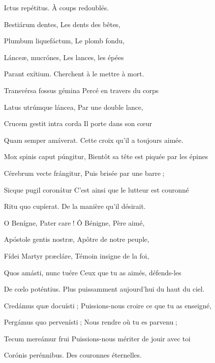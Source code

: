 \begin{paracol}{2}
Ictus repétitus.
\switchcolumn
À coups redoublés.
\switchcolumn*

Bestiárum dentes,
\switchcolumn
Les dents des bêtes,
\switchcolumn*

Plumbum liquefáctum,
\switchcolumn
Le plomb fondu,
\switchcolumn*

Lánceæ, mucrónes,
\switchcolumn
Les lances, les épées
\switchcolumn*

Parant exítium.
\switchcolumn
Cherchent à le mettre à mort.
\switchcolumn*

Transvérsa fossus gémina
\switchcolumn
Percé en travers du corps
\switchcolumn*

Latus utrúmque láncea,
\switchcolumn
Par une double lance,
\switchcolumn*

Crucem gestit intra corda
\switchcolumn
Il porte dans son cœur
\switchcolumn*

Quam semper amáverat.
\switchcolumn
Cette croix qu’il a toujours aimée.
\switchcolumn*

Mox spinis caput púngitur,
\switchcolumn
Bientôt sa tête est piquée par les épines
\switchcolumn*

Cérebrum vecte frángitur,
\switchcolumn
Puis brisée par une barre ;
\switchcolumn*

Sicque pugil coronátur
\switchcolumn
C’est ainsi que le lutteur est couronné
\switchcolumn*

Ritu quo cupíerat.
\switchcolumn
De la manière qu’il désirait.
\switchcolumn*

O Benígne, Pater care !
\switchcolumn
Ô Bénigne, Père aimé,
\switchcolumn*

Apóstole gentis nostræ,
\switchcolumn
Apôtre de notre peuple,
\switchcolumn*

Fídei Martyr præcláre,
\switchcolumn
Témoin insigne de la foi,
\switchcolumn*

Quos amásti, nunc tuére
\switchcolumn
Ceux que tu as aimés, défends-les
\switchcolumn*

De cœlo poténtius.
\switchcolumn
Plus puissamment aujourd’hui du haut du ciel.
\switchcolumn*

Credámus quæ docuísti ;
\switchcolumn
Puissions-nous croire ce que tu as enseigné,
\switchcolumn*

Pergámus quo pervenísti ;
\switchcolumn
Nous rendre où tu es parvenu ;
\switchcolumn*

Tecum mereámur frui
\switchcolumn
Puissions-nous mériter de jouir avec toi
\switchcolumn*

Corónis perénnibus.
\switchcolumn
Des couronnes éternelles.
\switchcolumn*


\end{paracol}
